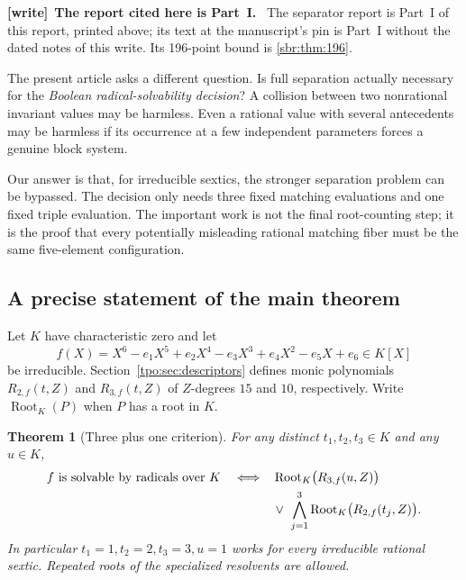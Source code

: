 \documentclass[11pt,letterpaper]{article}
\numberwithin{equation}{section}
\newtheorem{theorem}{Theorem}[section]
\theoremstyle{definition}
\theoremstyle{remark}
\newcommand{\Rtwo}{R_{2,f}}
\newcommand{\Rthree}{R_{3,f}}
\newenvironment{writenote}[1][]{\par\smallskip\begingroup\small
 \noindent\textbf{[write]}\if\relax\detokenize{#1}\relax\else~\textbf{#1.}\fi\ }%
 {\par\endgroup\smallskip}
\begin{document}
\begin{writenote}[The report cited here is Part~I]
The separator report \cite{tpo:separators} is Part~I of this report, printed
above; its text at the manuscript's pin is Part~I without the dated notes
of this write. Its 196-point bound is \cref{sbr:thm:196}.
\end{writenote}

The present article asks a different question. Is full separation actually
necessary for the \emph{Boolean radical-solvability decision}? A collision
between two nonrational invariant values may be harmless. Even a rational
value with several antecedents may be harmless if its occurrence at a few
independent parameters forces a genuine block system.

Our answer is that, for irreducible sextics, the stronger separation problem
can be bypassed. The decision only needs three fixed matching evaluations and
one fixed triple evaluation. The important work is not the final root-counting
step; it is the proof that every potentially misleading rational matching
fiber must be the same five-element configuration.

\subsection{A precise statement of the main theorem}
Let $K$ have characteristic zero and let
\begin{equation}
 f(X)=X^6-e_1X^5+e_2X^4-e_3X^3+e_4X^2-e_5X+e_6\in K[X]
 \label{tpo:eq:f}
\end{equation}
be irreducible. Section~\ref{tpo:sec:descriptors} defines monic polynomials
$\Rtwo(t,Z)$ and $\Rthree(t,Z)$ of $Z$-degrees $15$ and $10$, respectively.
Write $\operatorname{Root}_K(P)$ when $P$ has a root in $K$.

\begin{theorem}[Three plus one criterion]
\label{tpo:thm:main}
For any distinct $t_1,t_2,t_3\in K$ and any $u\in K$,
\begin{align}
 f\text{ is solvable by radicals over }K
 \quad\Longleftrightarrow\quad&
 \operatorname{Root}_K\bigl(\Rthree(u,Z)\bigr)\notag\\
 &\lor\ \bigwedge_{j=1}^3
 \operatorname{Root}_K\bigl(\Rtwo(t_j,Z)\bigr).
 \label{tpo:eq:main}
\end{align}
In particular $t_1=1,t_2=2,t_3=3,u=1$ works for every irreducible rational
sextic. Repeated roots of the specialized resolvents are allowed.
\end{theorem}
\end{document}
